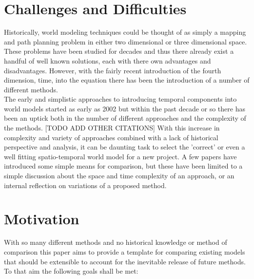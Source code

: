 \section{ Challenges and Difficulties }

Historically, world modeling techniques could be thought of as simply a mapping
and path planning problem in either two dimensional or three dimensional space.
These problems have been studied for decades and thus there already exist a
handful of well known solutions, each with there own advantages and
disadvantages. However, with the fairly recent introduction of the fourth
dimension, time, into the equation there has been the introduction of a number
of different methods. \\

The early and simplistic approaches to introducing temporal components into
world models started as early as 2002 \cite{Arbuckle2002} but within the past
decade or so there has been an uptick both in the number of different
approaches and the complexity of the methods. \cite{Krajnik2017} [TODO ADD
OTHER CITATIONS] With this increase in complexity and variety of approaches
combined with a lack of historical perspective and analysis, it can be
daunting task to select the 'correct' or even a well fitting spatio-temporal
world model for a new project. A few papers have introduced some simple means
for comparison, but these have been limited to a simple discussion about the
space and time complexity of an approach, or an internal reflection on
variations of a proposed method.


\section{ Motivation }

With so many different methods and no historical knowledge or method of comparison
this paper aims to provide a template for comparing existing models that should
be extensible to account for the inevitable release of future methods. To that
aim the following goals shall be met:


